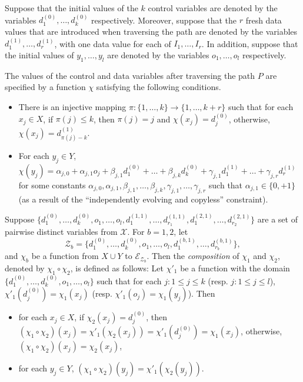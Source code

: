\documentclass[runningheads,a4paper]{llncs}
\def\Ee{{\mathcal{E} }}
\def\Zz{{\mathcal{Z} }}
\newcommand\intvars{\mathcal{X}}
\begin{document}
Suppose that the initial values of the $k$ control variables are denoted by the variables $d^{(0)}_1,\dots,d^{(0)}_k$ respectively. Moreover, suppose that the $r$ fresh data values that are introduced when traversing the path are denoted by the variables $d^{(1)}_{1},\dots,d^{(1)}_{r}$, with one data value for each of $I_{1},\dots,I_{r}$. 
In addition, suppose that the initial values of $y_1,\dots, y_l$ are denoted by the variables $o_1,\dots,o_l$ respectively. 

\begin{proposition}\label{prop-sum-path}
The values of the control and data variables after traversing the path $P$ are specified by a function $\chi$ satisfying the following conditions.
\begin{itemize}
\item There is an injective mapping $\pi: \{1,\dots,k\} \rightarrow \{1,\dots, k+r\}$ such that for each $x_j \in X$, if $\pi(j) \le k$, then $\pi(j)=j$ and $\chi(x_j)=d^{(0)}_{j}$, otherwise, $\chi(x_j)=d^{(1)}_{\pi(j)-k}$.
% 
\item For each $y_j \in Y$, $\chi(y_j) = \alpha_{j,0} + \alpha_{j,1} o_j + \beta_{j,1} d^{(0)}_1 + \dots + \beta_{j,k} d^{(0)}_k + \gamma_{j,1} d^{(1)}_1 +\dots + \gamma_{j,r} d^{(1)}_{r}$ for some constants $\alpha_{j,0},\alpha_{j,1}, \beta_{j,1},\dots,\beta_{j,k}, \gamma_{j,1},\dots,\gamma_{j,r}$ such that $\alpha_{j,1} \in \{0,+1\}$ (as a result of the ``independently evolving and copyless'' constraint).
\end{itemize}
\end{proposition}

Suppose $\{d^{(0)}_1,\dots,d^{(0)}_k, o_1,\dots,o_l, d^{(1,1)}_1,\dots,d^{(1,1)}_{r_1}, d^{(2,1)}_1,\dots,d^{(2,1)}_{r_2}\}$ are a set of pairwise distinct variables from $\intvars$. For $b=1,2$, let 
\[\Zz_b=\{d^{(0)}_1,\dots,d^{(0)}_k, o_1,\dots,o_l, d^{(b,1)}_1,\dots,d^{(b,1)}_{r_b}\},\] and $\chi_b$ be a function from $X \cup Y$ to $\Ee_{\mathcal{Z}_b}$. Then the \emph{composition} of $\chi_1$ and $\chi_2$, denoted by $\chi_1 \circ \chi_2$, is defined as follows: Let $\chi'_1$ be a function with the domain $\{d^{(0)}_1,\dots,d^{(0)}_k, o_1,\dots,o_l\}$ such that for each $j: 1 \le j \le k$ (resp. $j: 1 \le j \le l$), $\chi'_1(d^{(0)}_j)=\chi_1(x_j)$ (resp. $\chi'_1(o_j)=\chi_1(y_j)$). Then
\begin{itemize}
\item for each $x_j \in X$, if $\chi_2(x_j) = d^{(0)}_j$, then $(\chi_1 \circ \chi_2)(x_j)=\chi'_1(\chi_2(x_j)) = \chi'_1(d^{(0)}_j)=\chi_1(x_j)$, otherwise, $(\chi_1 \circ \chi_2)(x_j)=\chi_2(x_j)$,
%
\item for each $y_j \in Y$, $(\chi_1 \circ \chi_2)(y_j)=\chi'_1(\chi_2(y_j))$.
\end{itemize}
\end{document}
